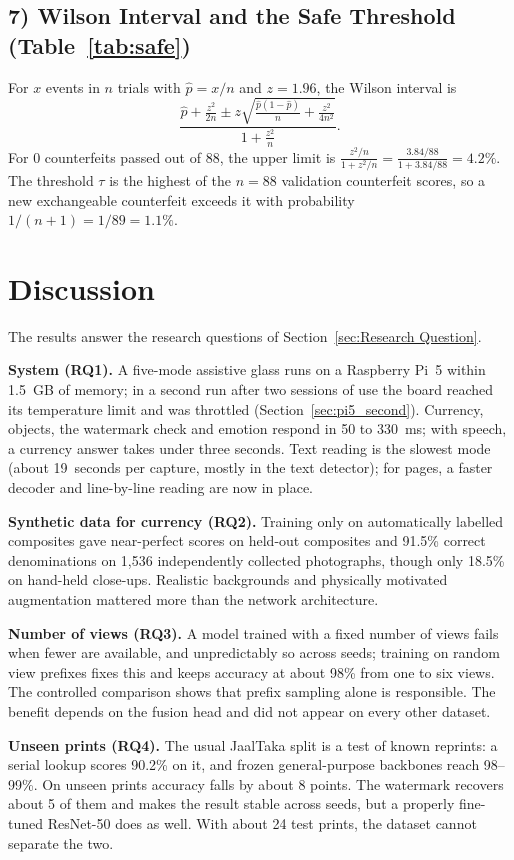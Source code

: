 \subsection*{7) Wilson Interval and the Safe Threshold (Table~\ref{tab:safe})}
For $x$ events in $n$ trials with $\hat{p} = x/n$ and $z = 1.96$, the Wilson interval is
\[
\frac{\hat{p} + \frac{z^2}{2n} \pm z\sqrt{\frac{\hat{p}(1-\hat{p})}{n} + \frac{z^2}{4n^2}}}{1 + \frac{z^2}{n}}.
\]
For 0 counterfeits passed out of 88, the upper limit is $\frac{z^2/n}{1+z^2/n} = \frac{3.84/88}{1+3.84/88} = 4.2\%$. The threshold $\tau$ is the highest of the $n = 88$ validation counterfeit scores, so a new exchangeable counterfeit exceeds it with probability $1/(n+1) = 1/89 = 1.1\%$.


\section{Discussion}
The results answer the research questions of Section~\ref{sec:Research Question}.

\textbf{System (RQ1).} A five-mode assistive glass runs on a Raspberry Pi~5 within 1.5~GB of memory; in a second run after two sessions of use the board reached its temperature limit and was throttled (Section~\ref{sec:pi5_second}). Currency, objects, the watermark check and emotion respond in 50 to 330~ms; with speech, a currency answer takes under three seconds. Text reading is the slowest mode (about 19~seconds per capture, mostly in the text detector); for pages, a faster decoder and line-by-line reading are now in place.

\textbf{Synthetic data for currency (RQ2).} Training only on automatically labelled composites gave near-perfect scores on held-out composites and 91.5\% correct denominations on 1,536 independently collected photographs, though only 18.5\% on hand-held close-ups. Realistic backgrounds and physically motivated augmentation mattered more than the network architecture. 

\textbf{Number of views (RQ3).} A model trained with a fixed number of views fails when fewer are available, and unpredictably so across seeds; training on random view prefixes fixes this and keeps accuracy at about 98\% from one to six views. The controlled comparison shows that prefix sampling alone is responsible. The benefit depends on the fusion head and did not appear on every other dataset.

\textbf{Unseen prints (RQ4).} The usual JaalTaka split is a test of known reprints: a serial lookup scores 90.2\% on it, and frozen general-purpose backbones reach 98--99\%. On unseen prints accuracy falls by about 8 points. The watermark recovers about 5 of them and makes the result stable across seeds, but a properly fine-tuned ResNet-50 does as well. With about 24 test prints, the dataset cannot separate the two.

